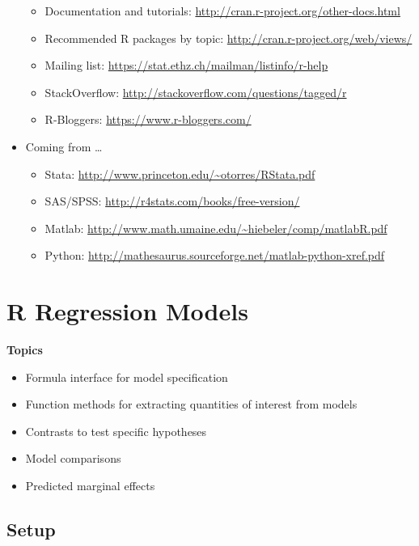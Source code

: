 \documentclass[]{book}
\providecommand{\tightlist}{%
  \setlength{\itemsep}{0pt}\setlength{\parskip}{0pt}}
\begin{document}
\begin{itemize}
  \begin{itemize}
  \tightlist
  \item
    Documentation and tutorials: \url{http://cran.r-project.org/other-docs.html}
  \item
    Recommended R packages by topic: \url{http://cran.r-project.org/web/views/}
  \item
    Mailing list: \url{https://stat.ethz.ch/mailman/listinfo/r-help}
  \item
    StackOverflow: \url{http://stackoverflow.com/questions/tagged/r}
  \item
    R-Bloggers: \url{https://www.r-bloggers.com/}
  \end{itemize}
\item
  Coming from \ldots{}

  \begin{itemize}
  \tightlist
  \item
    Stata: \url{http://www.princeton.edu/~otorres/RStata.pdf}
  \item
    SAS/SPSS: \url{http://r4stats.com/books/free-version/}
  \item
    Matlab: \url{http://www.math.umaine.edu/~hiebeler/comp/matlabR.pdf}
  \item
    Python: \url{http://mathesaurus.sourceforge.net/matlab-python-xref.pdf}
  \end{itemize}
\end{itemize}

\hypertarget{r-regression-models}{%
\chapter{R Regression Models}\label{r-regression-models}}

\textbf{Topics}

\begin{itemize}
\tightlist
\item
  Formula interface for model specification
\item
  Function methods for extracting quantities of interest from models
\item
  Contrasts to test specific hypotheses
\item
  Model comparisons
\item
  Predicted marginal effects
\end{itemize}

\hypertarget{setup-1}{%
\section{Setup}\label{setup-1}}
\end{document}
